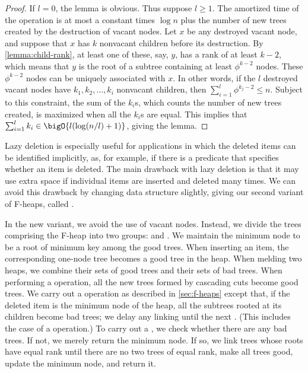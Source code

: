 \begin{proof}
	If \(l = 0\), the lemma is obvious. Thus suppose \(l \geq 1\). The amortized time
	of the  operation is at most a constant times \(\log n\) plus the
	number of new trees created by the destruction of vacant nodes. Let \(x\) be any
	destroyed vacant node, and suppose that \(x\) has \(k\) nonvacant children before
	its destruction. By \autoref{lemma:child-rank}, at least one of these, say,
	\(y\), has a rank of at least \(k - 2\), which means that \(y\) is the root of
	a subtree containing at least \(\phi^{k-2}\) nodes. These \(\phi^{k-2}\) nodes
	can be uniquely associated with \(x\). In other words, if the \(l\) destroyed
	vacant nodes have \(k_1, k_2, \dots, k_i\) nonvacant children, then
	\(\sum_{i=1}^l \phi^{k_j-2} \leq n\). Subject to this constraint, the sum of the
	\(k_i\)s, which counts the number of new trees created, is maximized when all the
	\(k_i\)s are equal. This implies that \(\sum_{i=1}^l k_i \in \bigO{l (\log(n/l)
	+ 1)}\), giving the lemma.
\end{proof}

Lazy deletion is especially useful for applications in which the deleted items can be
identified implicitly, as, for example, if there is a predicate that specifies
whether an item is deleted. The main drawback with lazy deletion is that it may use
extra space if individual items are inserted and deleted many times. We can avoid
this drawback by changing data structure slightly, giving our second variant of
F-heaps, called .

In the new variant, we avoid the use of vacant nodes. Instead, we divide the trees
comprising the F-heap into two groups:  and . We
maintain the minimum node to be a root of minimum key among the good trees. When
inserting an item, the corresponding one-node tree becomes a good tree in the heap.
When melding two heaps, we combine their sets of good trees and their sets of bad
trees. When performing a  operation, all the new trees formed by
cascading cuts become good trees. We carry out a  operation as described
in \autoref{sec:f-heaps} except that, if the deleted item is the minimum node of the
heap, all the subtrees rooted at its children become bad trees; we delay any linking
until the next . (This includes the case of a 
operation.) To carry out a , we check whether there are any bad trees.
If not, we merely return the minimum node. If so, we link trees whose roots have
equal rank until there are no two trees of equal rank, make all trees good, update
the minimum node, and return it.

